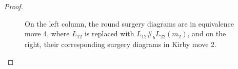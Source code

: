 \documentclass[10pt,a4paper]{amsart}
\begin{document}
\begin{proof}
\begin{figure}[ht]
    \centering
    
    \caption{On the left column, the round surgery diagrams are in equivalence move 4, where $L_{12}$ is replaced with $L_{12}\#_b L_{22}(m_2)$, and on the right, their corresponding surgery diagrams in Kirby move 2.}
    \label{fig:EM4-1222-Proof}
\end{figure}
\end{proof}
\end{document}
